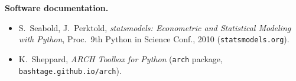\documentclass[a4paper,11pt,oneside]{book}
\begin{document}
\noindent\textbf{Software documentation.}
\begin{itemize}
  \item S.~Seabold, J.~Perktold, \emph{statsmodels:
        Econometric and Statistical Modeling with Python}, Proc.\
        9th Python in Science Conf., 2010
        (\texttt{statsmodels.org}).
  \item K.~Sheppard, \emph{ARCH Toolbox for Python}
        (\texttt{arch} package, \texttt{bashtage.github.io/arch}).
\end{itemize}
\end{document}
